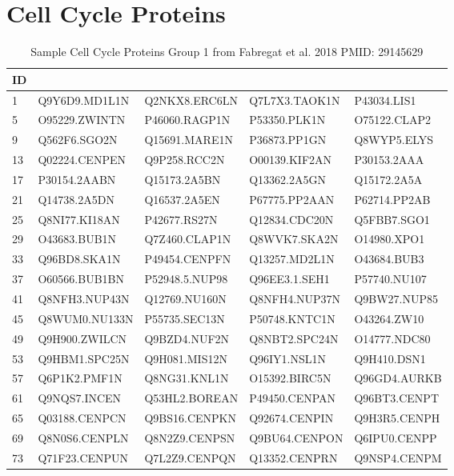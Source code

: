 \section{Cell Cycle Proteins}

\begin{table}[H]\tiny
\caption{Sample Cell Cycle Proteins Group 1 from Fabregat et al. 2018 PMID: 29145629}	
\begin{tabular}{p{0.5cm}p{1.5cm}p{1.5cm}p{1.5cm}p{1.5cm}}
\hline
ID &&&&\\ 
\hline   
  1 & Q9Y6D9.MD1L1N &  Q2NKX8.ERC6LN &  Q7L7X3.TAOK1N &  P43034.LIS1\\   
  5 & O95229.ZWINTN &  P46060.RAGP1N &  P53350.PLK1N &  O75122.CLAP2\\  
  9 & Q562F6.SGO2N &  Q15691.MARE1N &  P36873.PP1GN &  Q8WYP5.ELYS\\   
 13 & Q02224.CENPEN &  Q9P258.RCC2N &  O00139.KIF2AN &  P30153.2AAA\\   
 17 & P30154.2AABN &  Q15173.2A5BN &  Q13362.2A5GN &  Q15172.2A5A\\   
 21 & Q14738.2A5DN &  Q16537.2A5EN &  P67775.PP2AAN &  P62714.PP2AB\\  
 25 & Q8NI77.KI18AN &  P42677.RS27N &  Q12834.CDC20N &  Q5FBB7.SGO1\\   
 29 & O43683.BUB1N &  Q7Z460.CLAP1N &  Q8WVK7.SKA2N &  O14980.XPO1\\   
 33 & Q96BD8.SKA1N &  P49454.CENPFN &  Q13257.MD2L1N &  O43684.BUB3\\   
 37 & O60566.BUB1BN &  P52948.5.NUP98 & Q96EE3.1.SEH1 & P57740.NU107\\  
 41 & Q8NFH3.NUP43N &  Q12769.NU160N &  Q8NFH4.NUP37N &  Q9BW27.NUP85\\  
 45 & Q8WUM0.NU133N &  P55735.SEC13N &  P50748.KNTC1N &  O43264.ZW10\\   
 49 & Q9H900.ZWILCN &  Q9BZD4.NUF2N &  Q8NBT2.SPC24N &  O14777.NDC80\\  
 53 & Q9HBM1.SPC25N &  Q9H081.MIS12N &  Q96IY1.NSL1N &  Q9H410.DSN1\\   
 57 & Q6P1K2.PMF1N &  Q8NG31.KNL1N &  O15392.BIRC5N &  Q96GD4.AURKB\\  
 61 & Q9NQS7.INCEN &  Q53HL2.BOREAN &  P49450.CENPAN &  Q96BT3.CENPT\\  
 65 & Q03188.CENPCN &  Q9BS16.CENPKN &  Q92674.CENPIN &  Q9H3R5.CENPH\\  
 69 & Q8N0S6.CENPLN &  Q8N2Z9.CENPSN &  Q9BU64.CENPON &  Q6IPU0.CENPP\\  
 73 & Q71F23.CENPUN &  Q7L2Z9.CENPQN &  Q13352.CENPRN &  Q9NSP4.CENPM\\  

\end{tabular}
\end{table}
